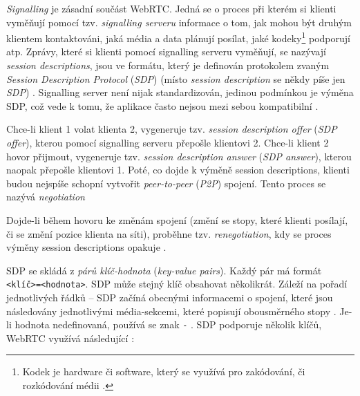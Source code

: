 \textit{Signalling} je zásadní součást WebRTC. Jedná se o proces při kterém si
klienti vyměňují pomocí tzv. \textit{signalling serveru} informace o tom, jak
mohou být druhým klientem kontaktováni, jaká média a data plánují posílat, jaké
kodeky\footnote{Kodek je hardware či software, který se využívá pro zakódování,
či rozkódování médii \cite{Britannica-Codec,TechTarget-Codec}.} podporují atp.
Zprávy, které si klienti pomocí signalling serveru vyměňují, se nazývají
\textit{session descriptions}, jsou ve formátu, který je definován protokolem
zvaným \textit{Session Description Protocol} (\textit{SDP}) (místo
\textit{session description} se někdy píše jen \textit{SDP})
\cite{WebRTCForTheCurious}. Signalling server není nijak standardizován, jedinou
podmínkou je výměna SDP, což vede k tomu, že aplikace často nejsou mezi sebou
kompatibilní \cite{MDN-Web-SignalingAndVideoCalling}.

Chce-li klient 1 volat klienta 2, vygeneruje tzv. \textit{session description
offer} (\textit{SDP offer}), kterou pomocí signalling serveru přepošle klientovi
2. Chce-li klient 2 hovor přijmout, vygeneruje tzv. \textit{session description
answer} (\textit{SDP answer}), kterou naopak přepošle klientovi 1. Poté, co
dojde k výměně session descriptions, klienti budou nejspíše schopní vytvořit
\textit{peer-to-peer} (\textit{P2P}) spojení. Tento proces se nazývá
\textit{negotiation}
\cite{WebRTCForTheCurious,MozillaBlog-PerfectNegotiation}

Dojde-li během hovoru ke změnám spojení (změní se stopy, které klienti posílají,
či se změní pozice klienta na síti), proběhne tzv. \textit{renegotiation}, kdy
se proces výměny session descriptions opakuje
\cite{MozillaBlog-PerfectNegotiation}.

SDP se skládá z \textit{párů klíč-hodnota} (\textit{key-value pairs}). Každý pár
má formát \texttt{<klíč>=<hodnota>}. SDP může stejný klíč obsahovat
několikrát. Záleží na pořadí jednotlivých řádků -- SDP začíná obecnými
informacemi o spojení, které jsou následovány jednotlivými média-sekcemi, které
popisují obousměrného stopy \cite{WebRTCForTheCurious}. Je-li hodnota
nedefinovaná, používá se znak \texttt{-} \cite{IETF-RFC8866}. SDP
podporuje několik klíčů, WebRTC využívá následující
\cite{WebRTCForTheCurious,IETF-RFC8866}:

